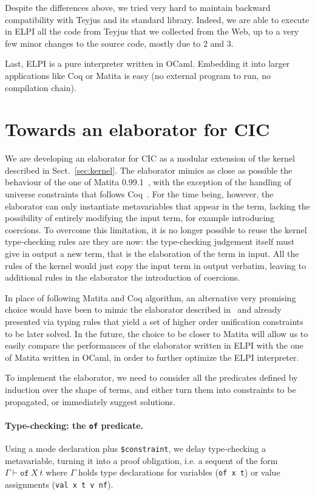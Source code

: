 \documentclass{easychair}
\begin{document}
Despite the differences above, we tried very hard to maintain backward
compatibility with Teyjus and its standard library. Indeed, we are able to
execute in ELPI all the code from Teyjus that we collected from the Web, up to
a very few minor changes to the source code, mostly due to 2 and 3.

Last, ELPI is a pure interpreter written in OCaml.  Embedding it into
larger applications like Coq or Matita is easy (no external program to
run, no compilation chain).


\section{Towards an elaborator for CIC}\label{sec:elaborator}
We are developing an elaborator for CIC as a modular extension of the kernel described in Sect.~\ref{sec:kernel}. The elaborator mimics as close as possible the behaviour of the one of Matita 0.99.1~\cite{bidir}, with the exception of the handling of universe constraints that follows Coq~\cite{algebraic}. For the time being, however, the elaborator can only instantiate metavariables that appear in the term, lacking the possibility of entirely modifying the input term, for example introducing coercions. To overcome this limitation, it is no longer possible to reuse the kernel type-checking rules are they are now: the type-checking judgement itself must give in output a new term, that is the elaboration of the term in input. All the rules of the kernel would just copy the input term in output verbatim, leaving to additional rules in the elaborator the introduction of coercions.

In place of following Matita and Coq algorithm, an alternative very promising choice would have been to mimic the elaborator described in~\cite{abel} and already presented via typing rules that yield a set of higher order unification constraints to be later solved. In the future, the choice to be closer to Matita will allow us to easily compare the performances of the elaborator written in ELPI with the one of Matita written in OCaml, in order to further optimize the ELPI interpreter.

To implement the elaborator, we need to consider all the predicates defined by induction over the shape of terms, and either turn them into constraints to be propagated, or immediately suggest solutions.

\paragraph{Type-checking: the \texttt{of} predicate.}
Using a mode declaration plus \verb+$constraint+, we delay type-checking a
metavariable, turning it into a proof obligation, i.e. a sequent of the form $\Gamma \vdash \mathtt{of}~X~t$ where $\Gamma$ holds type declarations for variables (\verb+of x t+) or value assignments (\verb+val x t v nf+).
\end{document}
